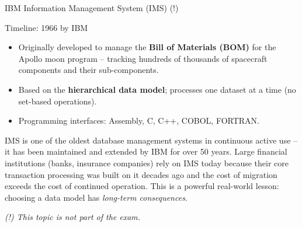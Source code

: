 \begin{frame}{IBM Information Management System (IMS) (!)}
  \begin{block}{Timeline: 1966 by IBM}
    \begin{itemize}
      \item Originally developed to manage the \textbf{Bill of Materials (BOM)}
            for the Apollo moon program -- tracking hundreds of thousands of
            spacecraft components and their sub-components.
      \item Based on the \textbf{hierarchical data model}; processes one dataset
            at a time (no set-based operations).
      \item Programming interfaces: Assembly, C, C++, COBOL, FORTRAN.
    \end{itemize}
  \end{block}

  IMS is one of the oldest database management systems in continuous active use
  -- it has been maintained and extended by IBM for over 50 years.
  Large financial institutions (banks, insurance companies) rely on IMS today
  because their core transaction processing was built on it decades ago and
  the cost of migration exceeds the cost of continued operation.
  This is a powerful real-world lesson: choosing a data model has
  \emph{long-term consequences}.

  \smallskip
  \textit{(!) This topic is not part of the exam.}
\end{frame}

